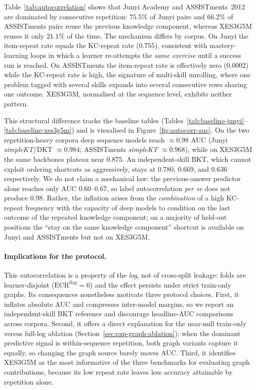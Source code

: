 \documentclass[pdflatex,sn-basic]{sn-jnl}
\newcommand{\KC}{knowledge component}
\begin{document}
Table~\ref{tab:autocorrelation} shows that Junyi Academy and ASSISTments~2012
are dominated by consecutive repetition: $75.5\%$ of Junyi pairs and $66.2\%$
of ASSISTments pairs reuse the previous \KC{}, whereas XES3G5M reuses it only
$21.1\%$ of the time. The mechanism differs by corpus. On Junyi the item-repeat
rate equals the KC-repeat rate ($0.755$), consistent with mastery-learning loops
in which a learner re-attempts the \emph{same exercise} until a success run is
reached. On ASSISTments the item-repeat rate is effectively zero ($0.0002$) while
the KC-repeat rate is high, the signature of multi-skill unrolling, where one
problem tagged with several skills expands into several consecutive rows sharing
one outcome. XES3G5M, normalised at the sequence level, exhibits neither pattern.

This structural difference tracks the baseline tables
(Tables~\ref{tab:baseline-junyi}--\ref{tab:baseline-xes3g5m}) and is
visualised in Figure~\ref{fig:autocorr-auc}. On the two
repetition-heavy corpora deep sequence models reach ${\approx}0.98$ AUC (Junyi
\textit{simpleKT}/DKT ${\approx}0.984$; ASSISTments \textit{simpleKT}
${\approx}0.968$), while on XES3G5M the same backbones plateau near $0.875$. An
independent-skill BKT, which cannot exploit ordering shortcuts as aggressively,
stays at $0.780$, $0.669$, and $0.636$ respectively. We do not claim a
mechanical law: the previous-answer predictor alone reaches only AUC
$0.60$--$0.67$, so label autocorrelation \emph{per se} does not produce $0.98$.
Rather, the inflation arises from the \emph{combination} of a high KC-repeat
frequency with the capacity of deep models to condition on the last outcome of
the repeated \KC{}; on a majority of held-out positions the ``stay on the same
\KC{}'' shortcut is available on Junyi and ASSISTments but not on XES3G5M.

\paragraph{Implications for the protocol.}
This autocorrelation is a property of the \emph{log}, not of cross-split
leakage: folds are learner-disjoint ($\mathrm{ECR}^{\mathrm{flag}}{=}0$) and the
effect persists under strict train-only graphs. Its consequences nonetheless
motivate three protocol choices. First, it inflates absolute AUC and compresses
inter-model margins, so we report an independent-skill BKT reference and
discourage headline-AUC comparisons across corpora. Second, it offers a direct
explanation for the near-null train-only versus full-log ablation
(Section~\ref{sec:exp-graph-ablation}): when the dominant predictive signal is
within-sequence repetition, both graph variants capture it equally, so changing
the graph source barely moves AUC. Third, it identifies XES3G5M as the most
informative of the three benchmarks for evaluating graph contributions, because
its low repeat rate leaves less accuracy attainable by repetition alone.
\end{document}
